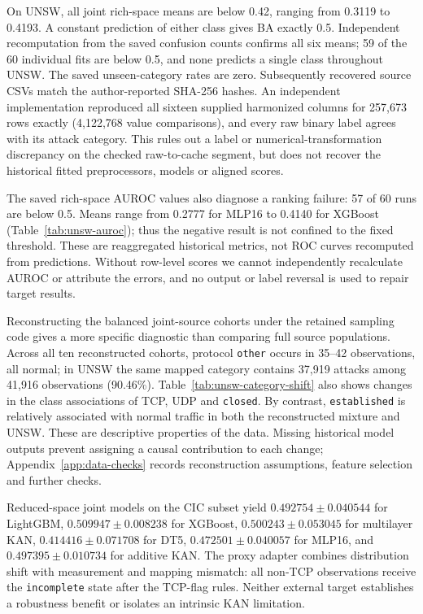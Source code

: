 \documentclass{ieeeaccess}
\begin{document}
On UNSW, all joint rich-space means are below 0.42, ranging from 0.3119 to 0.4193. A constant prediction of either class gives BA exactly 0.5. Independent recomputation from the saved confusion counts confirms all six means; 59 of the 60 individual fits are below 0.5, and none predicts a single class throughout UNSW. The saved unseen-category rates are zero. Subsequently recovered source CSVs match the author-reported SHA-256 hashes. An independent implementation reproduced all sixteen supplied harmonized columns for 257,673 rows exactly (4,122,768 value comparisons), and every raw binary label agrees with its attack category. This rules out a label or numerical-transformation discrepancy on the checked raw-to-cache segment, but does not recover the historical fitted preprocessors, models or aligned scores.

The saved rich-space AUROC values also diagnose a ranking failure: 57 of 60 runs are below 0.5. Means range from 0.2777 for MLP16 to 0.4140 for XGBoost (Table~\ref{tab:unsw-auroc}); thus the negative result is not confined to the fixed threshold. These are reaggregated historical metrics, not ROC curves recomputed from predictions. Without row-level scores we cannot independently recalculate AUROC or attribute the errors, and no output or label reversal is used to repair target results.



Reconstructing the balanced joint-source cohorts under the retained sampling code gives a more specific diagnostic than comparing full source populations. Across all ten reconstructed cohorts, protocol \texttt{other} occurs in 35--42 observations, all normal; in UNSW the same mapped category contains 37,919 attacks among 41,916 observations (90.46\%). Table~\ref{tab:unsw-category-shift} also shows changes in the class associations of TCP, UDP and \texttt{closed}. By contrast, \texttt{established} is relatively associated with normal traffic in both the reconstructed mixture and UNSW. These are descriptive properties of the data. Missing historical model outputs prevent assigning a causal contribution to each change; Appendix~\ref{app:data-checks} records reconstruction assumptions, feature selection and further checks.

Reduced-space joint models on the CIC subset yield $0.492754\pm0.040544$ for LightGBM, $0.509947\pm0.008238$ for XGBoost, $0.500243\pm0.053045$ for multilayer KAN, $0.414416\pm0.071708$ for DT5, $0.472501\pm0.040057$ for MLP16, and $0.497395\pm0.010734$ for additive KAN. The proxy adapter combines distribution shift with measurement and mapping mismatch: all non-TCP observations receive the \texttt{incomplete} state after the TCP-flag rules. Neither external target establishes a robustness benefit or isolates an intrinsic KAN limitation.
\end{document}
